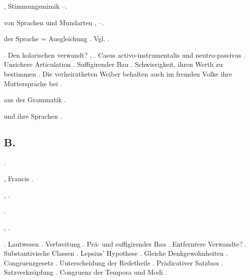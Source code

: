 \begin{register}
, Stimmungsmimik \pageref{sp.376}–\pageref{sp.380}.

 von Sprachen und Mundarten \pageref{sp.146}, \pageref{sp.260}–\pageref{sp.261}.

 der Sprache = Ausgleichung \pageref{sp.259}. Vgl. .

 \pageref{sp.142}. Den kolarischen verwandt? \pageref{sp.147}, \sed{\pageref{sp.152},} \pageref{sp.281}. Casus activo-instrumentalis und neutro-passivus \pageref{sp.151}. Unsichere Articulation \pageref{sp.194}. Suffigirender Bau \pageref{sp.349}.  Schwierigkeit, ihren Werth zu bestimmen \pageref{sp.425}. Die verheiratheten Weiber behalten auch im fremden Volke ihre Muttersprache bei \pageref{sp.428}.

 aus der Grammatik \pageref{sp.108}.

 und ihre Sprachen \pageref{sp.143}.



\subsection*{B.}\label{reg.B}



 \pageref{sp.216}.

, Francis \sed{\pageref{sp.15},} \pageref{sp.158}.

,  \sed{\pageref{sp.208},} \pageref{sp.282}.

 \pageref{sp.357}.


 \pageref{sp.150}, \pageref{sp.282}.

. Lautwesen \pageref{sp.34}. Verbreitung \pageref{sp.142}. Prä- und suffigirender Bau \pageref{sp.149}. Entferntere Verwandte? \pageref{sp.150}. Substantivische Classen \pageref{sp.150}. Lepsius’ Hypothese \pageref{sp.282}. Gleiche Denkgewohnheiten \pageref{sp.293}.  Congruenzgesetz \pageref{sp.390}.  Unterscheidung der Redetheile \pageref{sp.440}. Prädicativer Satzbau \pageref{sp.453}. Satzverknüpfung \pageref{sp.465}. Congruenz der Tempora und Modi \pageref{sp.466}.


\end{register}
